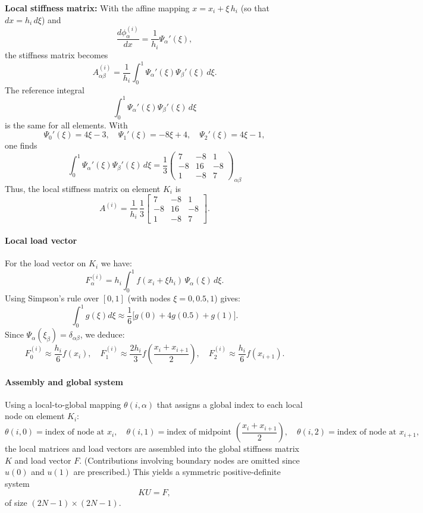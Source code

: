 \documentclass[a4paper,10pt]{article}
\begin{document}
\textbf{Local stiffness matrix:} With the affine mapping \(x=x_i+\xi\,h_i\) (so that \(dx=h_i\,d\xi\)) and
\[
	\frac{d\phi_\alpha^{(i)}}{dx}=\frac{1}{h_i}\Psi_\alpha'(\xi),
\]
the stiffness matrix becomes
\[
	A^{(i)}_{\alpha\beta}=\frac{1}{h_i}\int_0^1 \Psi_\alpha'(\xi)\Psi_\beta'(\xi)\,d\xi.
\]
The reference integral
\[
	\int_0^1 \Psi_\alpha'(\xi)\Psi_\beta'(\xi)\,d\xi
\]
is the same for all elements. With
\[
	\Psi_0'(\xi)=4\xi-3,\quad \Psi_1'(\xi)=-8\xi+4,\quad \Psi_2'(\xi)=4\xi-1,
\]
one finds
\[
	\int_0^1 \Psi_\alpha'(\xi)\Psi_\beta'(\xi)\,d\xi = \frac{1}{3}
	\begin{pmatrix}
		7  & -8 & 1  \\[1mm]
		-8 & 16 & -8 \\[1mm]
		1  & -8 & 7
	\end{pmatrix}_{\alpha\beta}
\]
Thus, the local stiffness matrix on element \(K_i\) is
\[
	A^{(i)}=\frac{1}{h_i}\,\frac{1}{3}
	\begin{bmatrix}
		7  & -8 & 1  \\[1mm]
		-8 & 16 & -8 \\[1mm]
		1  & -8 & 7
	\end{bmatrix}.
\]

\paragraph{Local load vector}
For the load vector on \(K_i\) we have:
\[
	F^{(i)}_\alpha=h_i\int_0^1 f(x_i+\xi h_i)\,\Psi_\alpha(\xi)\,d\xi.
\]
Using Simpson's rule over \([0,1]\) (with nodes \(\xi=0,0.5,1\)) gives:
\[
	\int_0^1 g(\xi)d\xi\approx \frac{1}{6}\Big[g(0)+4g(0.5)+g(1)\Big].
\]
Since \(\Psi_\alpha(\xi_\beta)=\delta_{\alpha\beta}\), we deduce:
\[
	F^{(i)}_0\approx \frac{h_i}{6}f(x_i),\quad
	F^{(i)}_1\approx \frac{2h_i}{3}f\!\left(\frac{x_i+x_{i+1}}{2}\right),\quad
	F^{(i)}_2\approx \frac{h_i}{6}f(x_{i+1}).
\]

\paragraph{Assembly and global system}
Using a local-to-global mapping \(\theta(i,\alpha)\) that assigns a global index to each local node on element \(K_i\):
\[
	\theta(i,0) = \text{index of node at } x_i,\quad
	\theta(i,1) = \text{index of midpoint } \left(\frac{x_i+x_{i+1}}{2}\right),\quad
	\theta(i,2) = \text{index of node at } x_{i+1},
\]
the local matrices and load vectors are assembled into the global stiffness matrix \(K\) and load vector \(F\). (Contributions involving boundary nodes are omitted since \(u(0)\) and \(u(1)\) are prescribed.) This yields a symmetric positive-definite system
\[
	KU=F,
\]
of size \((2N-1)\times(2N-1)\).
\end{document}

